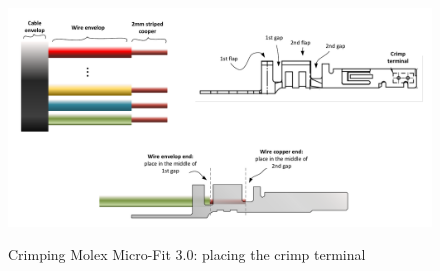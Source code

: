 \begin{figure}
  \centering
  \includegraphics[angle=90,width=1\columnwidth]{figs/body03/FIGCRIMPmicro1.pdf}\\
  \caption[Crimping Molex Micro-Fit 3.0\texttrademark: placing the crimp terminal]{Crimping Molex Micro-Fit 3.0\texttrademark: placing the crimp terminal}
  \label{FIG:CRIMPmicro1}
\end{figure}
